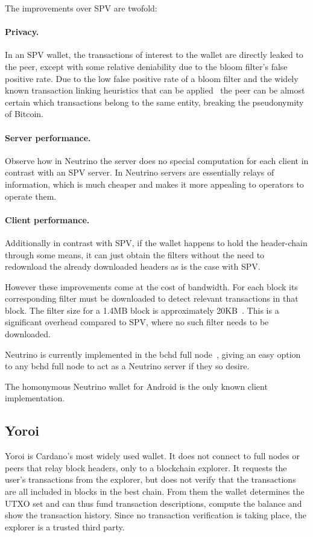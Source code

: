 \documentclass[sigconf,authordraft]{acmart}
\begin{document}
The improvements over SPV are twofold:
\paragraph{Privacy.} In an SPV wallet, the transactions of interest to the wallet are directly leaked to the peer, except with some relative deniability due to the bloom filter's false positive rate. Due to the low false positive rate of a bloom filter and the widely known transaction linking heuristics that can be applied~\cite{meiklejohn2013fistful,gervais2014privacy}
the peer can be almost certain which transactions belong to the same entity, breaking the pseudonymity of Bitcoin.
\paragraph{Server performance.} Observe how in Neutrino the server does no special computation for each client in contrast with an SPV server. In Neutrino servers are essentially relays of information, which is much cheaper and makes it more appealing to operators to operate them.
\paragraph{Client performance.} Additionally in contrast with SPV, if the wallet happens to hold the header-chain through some means, it can just obtain the filters without the need to redownload the already downloaded headers as is the case with SPV.

However these improvements come at the cost of bandwidth. For each block its corresponding filter must be downloaded to detect relevant transactions in that block. The filter size for a 1.4MB block is approximately 20KB~\cite{jimmysong}. This is a significant overhead compared to SPV, where no such filter needs to be downloaded.

Neutrino is currently implemented in the bchd full node~\cite{bchd}, giving an easy option to any bchd full node to act as a Neutrino server if they so desire.

The homonymous Neutrino wallet for Android is the only known client implementation.

\subsection{Yoroi}
Yoroi is Cardano's most widely used wallet. It does not connect to full nodes or peers that relay block headers, only to a blockchain explorer. It requests the user's transactions from the explorer, but does not verify that the transactions are all included in blocks in the best chain. From them the wallet determines the UTXO set and can thus fund transaction descriptions, compute the balance and show the transaction history. Since no transaction verification is taking place, the explorer is a trusted third party.
\end{document}
